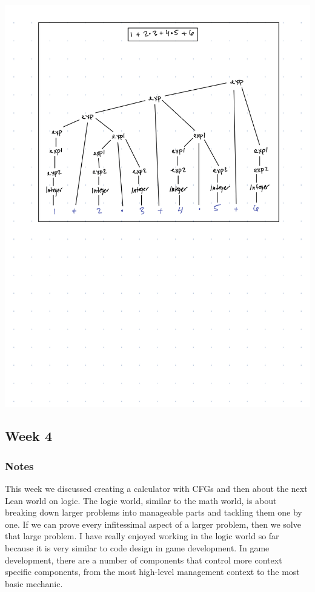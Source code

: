 \documentclass{article}
\theoremstyle{theorem}
\theoremstyle{definition}
\theoremstyle{remark}
\begin{document}
\begin{center}
\includegraphics[scale=.6]{CPSC354 HW4-2.png}
\end{center}

\subsection{Week 4}

\subsubsection*{Notes} This week we discussed creating a calculator with CFGs and then about the next Lean world on logic. The logic world, similar to the math world, is about breaking down larger problems into manageable parts and tackling them one by one. If we can prove every infitessimal aspect of a larger problem, then we solve that large problem. I have really enjoyed working in the logic world so far because it is very similar to code design in game development. In game development, there are a number of components that control more context specific components, from the most high-level management context to the most basic mechanic. 
\end{document}
